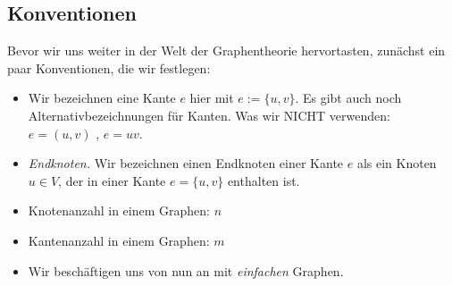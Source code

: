 \documentclass{article}
\theoremstyle{plain}
\begin{document}
\subsection{Konventionen}
Bevor wir uns weiter in der Welt der Graphentheorie hervortasten, zunächst ein paar Konventionen, die wir festlegen:
\begin{itemize}
        \item Wir bezeichnen eine  Kante \(e\) hier mit \(e:= \{u, v\}\). Es gibt auch noch Alternativbezeichnungen für Kanten. Was wir NICHT verwenden: \(e = (u, v)\) , \(e = uv\).
        \item \textit{Endknoten.} Wir bezeichnen einen Endknoten einer Kante \(e\) als ein Knoten \(u \in V\), der in einer Kante \(e = \{u, v\}\) enthalten ist. 
        \item Knotenanzahl in einem Graphen: \(n\)
        \item Kantenanzahl in einem Graphen: \(m\)
        \item Wir beschäftigen uns von nun an mit \textit{einfachen} Graphen.\cite[S.~5]{bue_1}
    \end{itemize}

\newpage
\end{document}
